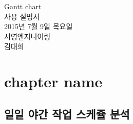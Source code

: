 \documentclass[12pt,a3paper,landscape,oneside]{book}
\begin{document}
	
			\dominitoc
			
	\begin{titlepage}
		\vspace*{2cm}
		\centering 
		\Huge {Gantt chart}\\
		\vspace{1cm}
		\Huge {사용 설명서 }\\
		\vfill
		\Large {2015년 7월 9일 목요일 }\\
		\vfill
		\Large {서영엔지니어링 }\\
		\Large {김대희}\\
		\vspace{1cm}
	\end{titlepage}


%
			


	\newpage
	\chapter{chapter name}



	\newpage
	\section{일일 야간 작업 스케쥴 분석}
\end{document}
